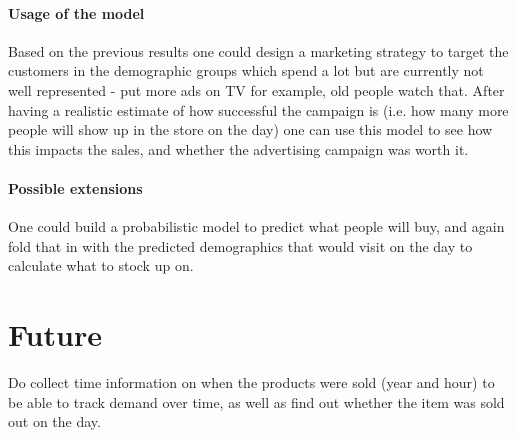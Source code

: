 \documentclass{article}
\begin{document}
\paragraph{Usage of the model}

Based on the previous results one could design a marketing strategy to target the customers in the demographic groups which spend a lot but are currently not well represented - put more ads on TV for example, old people watch that. After having a realistic estimate of how successful the campaign is (i.e. how many more people will show up in the store on the day) one can use this model to see how this impacts the sales, and whether the advertising campaign was worth it.

\paragraph{Possible extensions}

One could build a probabilistic model to predict what people will buy, and again fold that in with the predicted demographics that would visit on the day to calculate what to stock up on. 

\section{Future}

Do collect time information on when the products were sold (year and hour) to be able to track demand over time, as well as find out whether the item was sold out on the day.


\small
\bigskip
\bigskip


\end{document}

